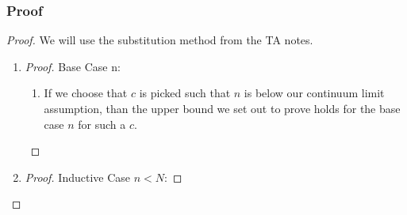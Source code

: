 \documentclass{article}
\begin{document}
\subsubsection{Proof}
\begin{proof} We will use the substitution method from the TA notes.
      \begin{enumerate}

            \item \begin{proof}
                        Base Case n:
                        \begin{enumerate}
                              \item If we choose that \(c\) is picked such that \(n\) is
                                    below our continuum limit assumption, than the upper
                                    bound we set out to prove holds for the base case
                                    \(n\) for such a \(c\).
                        \end{enumerate}
                  \end{proof}
            \item \begin{proof}

                        Inductive Case \(n < N\):


\end{proof}
\end{enumerate}
\end{proof}
\end{document}
